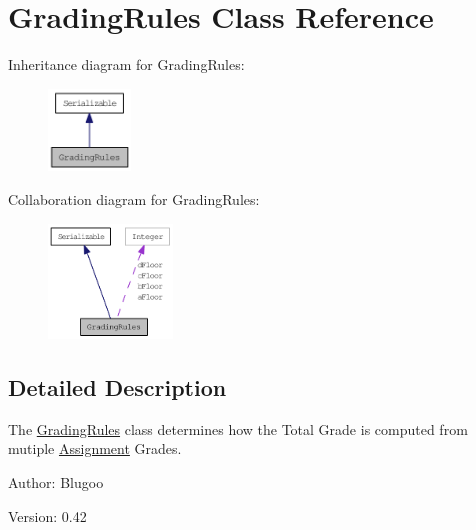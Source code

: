 \hypertarget{classGradingRules}{
\section{GradingRules Class Reference}
\label{classGradingRules}
}
Inheritance diagram for GradingRules:\nopagebreak
\begin{figure}[H]
\begin{center}
\leavevmode
\includegraphics[width=62pt]{classGradingRules__inherit__graph}
\end{center}
\end{figure}
Collaboration diagram for GradingRules:\nopagebreak
\begin{figure}[H]
\begin{center}
\leavevmode
\includegraphics[width=94pt]{classGradingRules__coll__graph}
\end{center}
\end{figure}


\subsection{Detailed Description}
The \hyperlink{classGradingRules}{GradingRules} class determines how the Total Grade is computed from mutiple \hyperlink{classAssignment}{Assignment} Grades. 

\begin{Desc}
\item[Author:]Blugoo \end{Desc}
\begin{Desc}
\item[Version:]0.42 \end{Desc}


